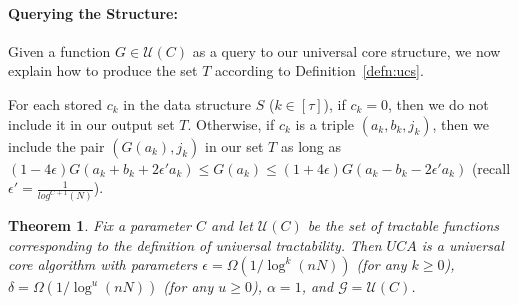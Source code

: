 \documentclass[11pt]{article}
\newtheorem{thm}{Theorem}
\begin{document}
\paragraph{Querying the Structure:} Given a function $G \in \mathcal{U}(C)$ as a query to our universal
core structure, we now explain how to produce the set $T$ according to Definition~\ref{defn:ucs}.

For each stored $c_k$ in the data structure $S$ ($k \in [\tau]$), if $c_k = 0$, then
we do not include it in our output set $T$.  Otherwise, if $c_k$ is a triple $(a_k,b_k,j_k)$,
then we include the pair $(G(a_k),j_k)$ in our set $T$ as long as
$(1-4\epsilon)G(a_k + b_k + 2 \epsilon' a_k) \leq G(a_k) \leq (1+4\epsilon)G(a_k - b_k - 2 \epsilon' a_k)$
(recall $\epsilon' = \frac{1}{log^{C+1}(N)}$).


\begin{thm}\label{thm:ucore}
Fix a parameter $C$ and let $\mathcal{U}(C)$ be the set of tractable functions corresponding to the
definition of universal tractability.  Then $UCA$ is a universal core algorithm with parameters
$\epsilon = \Omega(1/\log^k(nN))$ (for any $k \geq 0$), $\delta = \Omega(1/\log^{u}(nN))$
(for any $u \geq 0$), $\alpha = 1$, and $\mathcal{G} = \mathcal{U}(C)$.
\end{thm}
\end{document}
